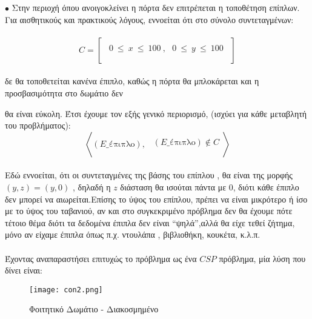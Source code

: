 \documentclass[10pt]{article}
\begin{document}
\hspace{10mm}$\bullet$ Στην περιοχή όπου ανοιγοκλείνει η πόρτα δεν επιτρέπεται η τοποθέτηση επίπλων.
 \\

\hspace{15mm}Για αισθητικούς και πρακτικούς λόγους, εννοείται ότι στο σύνολο συντεταγμένων: \\ \\
\[  C =
\left[ 
\begin{array}{ll}
\\
     \ \  0 \ \leq \ x \ \leq \ 100 \ , \ \ \ 0 \ \leq \ y \ \leq \ 100 \ \
     \\ \\
     \end{array} 
\right ] \] 
\\ 

\hspace{15mm}δε θα τοποθετείται κανένα έπιπλο, καθώς η πόρτα θα μπλοκάρεται και η προσβασιμότητα στο δωμάτιο δεν 

\hspace{15mm}θα είναι εύκολη. Έτσι έχουμε τον εξής γενικό περιορισμό, (ισχύει για κάθε μεταβλητή του προβλήματος): \\

\[ 
\left<   (E\_\text{έπιπλο}) , 
\begin{array}{ll}
\\  \ \ (E\_\text{έπιπλο}) \notin C \\ \\
     
     \end{array} 
\right > \] 
\\ 


Εδώ εννοείται, ότι  οι συντεταγμένες της βάσης του επίπλου , θα είναι της μορφής $(y, z) = (y,0)$ , δηλαδή η $z$ διάσταση θα ισούται πάντα με 0, διότι κάθε έπιπλο δεν μπορεί να αιωρείται.Επίσης το ύψος του επίπλου, πρέπει να είναι μικρότερο ή ίσο με το ύψος του ταβανιού, αν και στο συγκεκριμένο πρόβλημα δεν θα έχουμε πότε τέτοιο θέμα διότι τα δεδομένα έπιπλα δεν είναι “ψηλά”,αλλά θα είχε τεθεί ζήτημα, μόνο αν είχαμε έπιπλα όπως π.χ. ντουλάπα , βιβλιοθήκη, κουκέτα, κ.λ.π. \\ \\  
Έχοντας αναπαραστήσει επιτυχώς το πρόβλημα ως ένα $CSP$ πρόβλημα, μία λύση που δίνει είναι: 
\begin{figure}[H]
  \centering
  \texttt{[image: con2.png]}
  \caption{Φοιτητικό Δωμάτιο - Διακοσμημένο}
  \label{con2.png}
\end{figure} 
\end{document}
